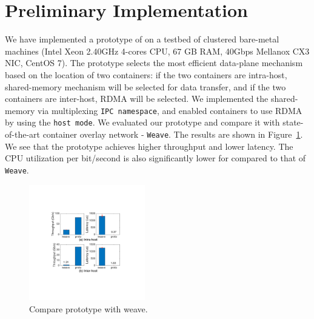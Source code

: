 \section{Preliminary Implementation} \label{sec:implementation}

We have implemented a prototype of \sysname on a testbed of clustered bare-metal
machines (Intel Xeon 2.40GHz 4-cores CPU, 67 GB RAM, 40Gbps Mellanox CX3 NIC,
CentOS 7). The prototype selects the most efficient data-plane mechanism based
on the location of two containers: if the two containers are intra-host,
shared-memory mechanism will be selected for data transfer, and if the two
containers are inter-host, RDMA will be selected.  We implemented the
shared-memory via multiplexing \texttt{IPC namespace}, and enabled containers to
use RDMA by using the \texttt{host mode}.  We evaluated our prototype and
compare it with state-of-the-art container overlay network - \texttt{Weave}. The
results are shown in Figure~\ref{fig:sys_eval_proto}. We see that the \sysname
prototype achieves higher throughput and lower latency. The CPU utilization per
bit/second is also significantly lower for \sysname compared to that of
\texttt{Weave}. 

\begin{figure}[ht]
\centering 
\includegraphics[width=0.45\textwidth]{figures/system/eval_proto.pdf}
\caption{Compare \sysname prototype with weave.} 
\label{fig:sys_eval_proto}
\end{figure}



